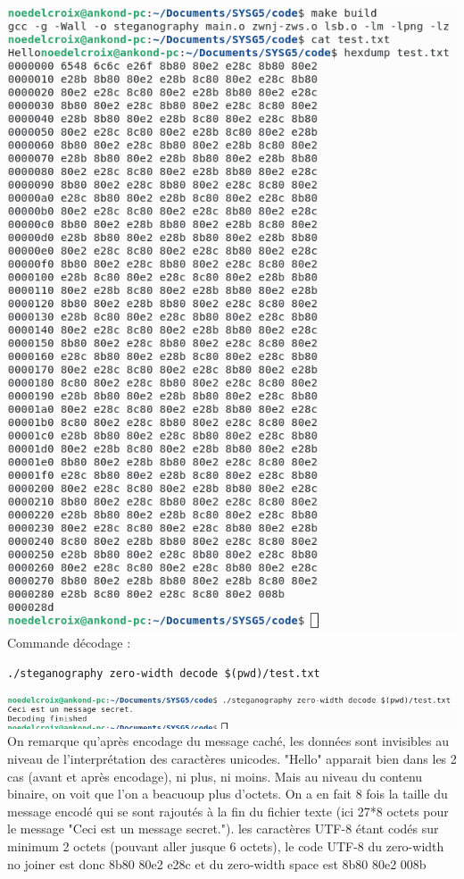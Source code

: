 \includegraphics[width=1\textwidth]{img/resultat_after_zero-width.png}
Commande décodage :
\begin{lstlisting}
./steganography zero-width decode $(pwd)/test.txt
\end{lstlisting}
\includegraphics[width=1.3\textwidth]{img/resultat_commande_decodage_zero-width.png}
On remarque qu'après encodage du message caché, les données sont invisibles au niveau de l'interprétation des caractères unicodes. "Hello" apparait bien dans les 2 cas (avant et après encodage), ni plus, ni moins.
\newline
Mais au niveau du contenu binaire, on voit que l'on a beacuoup plus d'octets. On a en fait 8 fois la taille du message encodé qui se sont rajoutés à la fin du fichier texte (ici 27*8 octets pour le message "Ceci est un message secret.").
\newline
les caractères UTF-8 étant codés sur minimum 2 octets (pouvant aller jusque 6 octets), le code UTF-8 du zero-width no joiner est donc 8b80 80e2 e28c et du zero-width space est 8b80 80e2 008b
